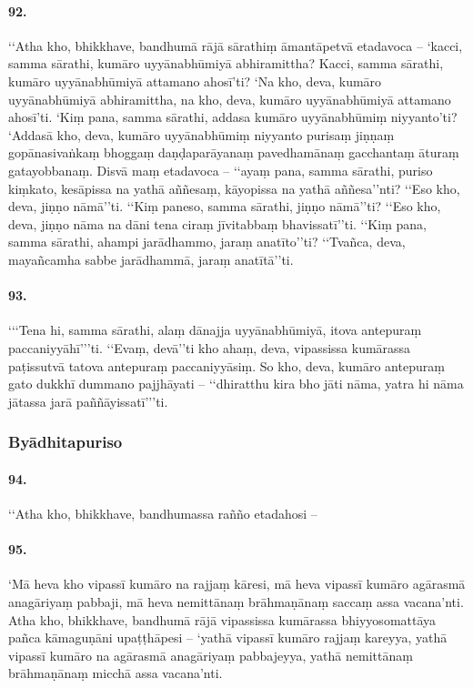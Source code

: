 \paragraph{92.} ‘‘Atha kho, bhikkhave, bandhumā rājā sārathiṃ āmantāpetvā etadavoca – ‘kacci, samma sārathi, kumāro uyyānabhūmiyā abhiramittha? Kacci, samma sārathi, kumāro uyyānabhūmiyā attamano ahosī’ti? ‘Na kho, deva, kumāro uyyānabhūmiyā abhiramittha, na kho, deva, kumāro uyyānabhūmiyā attamano ahosī’ti. ‘Kiṃ pana, samma sārathi, addasa kumāro uyyānabhūmiṃ niyyanto’ti? ‘Addasā kho, deva, kumāro uyyānabhūmiṃ niyyanto purisaṃ jiṇṇaṃ gopānasivaṅkaṃ bhoggaṃ daṇḍaparāyanaṃ pavedhamānaṃ gacchantaṃ āturaṃ gatayobbanaṃ. Disvā maṃ etadavoca – ‘‘ayaṃ pana, samma sārathi, puriso kiṃkato, kesāpissa na yathā aññesaṃ, kāyopissa na yathā aññesa’’nti? ‘‘Eso kho, deva, jiṇṇo nāmā’’ti. ‘‘Kiṃ paneso, samma sārathi, jiṇṇo nāmā’’ti? ‘‘Eso kho, deva, jiṇṇo nāma na dāni tena ciraṃ jīvitabbaṃ bhavissatī’’ti. ‘‘Kiṃ pana, samma sārathi, ahampi jarādhammo, jaraṃ anatīto’’ti? ‘‘Tvañca, deva, mayañcamha sabbe jarādhammā, jaraṃ anatītā’’ti.

\paragraph{93.} ‘‘‘Tena hi, samma sārathi, alaṃ dānajja uyyānabhūmiyā, itova antepuraṃ paccaniyyāhī’’’ti. ‘‘Evaṃ, devā’’ti kho ahaṃ, deva, vipassissa kumārassa paṭissutvā tatova antepuraṃ paccaniyyāsiṃ. So kho, deva, kumāro antepuraṃ gato dukkhī dummano pajjhāyati – ‘‘dhiratthu kira bho jāti nāma, yatra hi nāma jātassa jarā paññāyissatī’’’ti.

\subsubsection{Byādhitapuriso}

\paragraph{94.} ‘‘Atha kho, bhikkhave, bandhumassa rañño etadahosi –

\paragraph{95.}‘Mā heva kho vipassī kumāro na rajjaṃ kāresi, mā heva vipassī kumāro agārasmā anagāriyaṃ pabbaji, mā heva nemittānaṃ brāhmaṇānaṃ saccaṃ assa vacana’nti. Atha kho, bhikkhave, bandhumā rājā vipassissa kumārassa bhiyyosomattāya pañca kāmaguṇāni upaṭṭhāpesi – ‘yathā vipassī kumāro rajjaṃ kareyya, yathā vipassī kumāro na agārasmā anagāriyaṃ pabbajeyya, yathā nemittānaṃ brāhmaṇānaṃ micchā assa vacana’nti.

